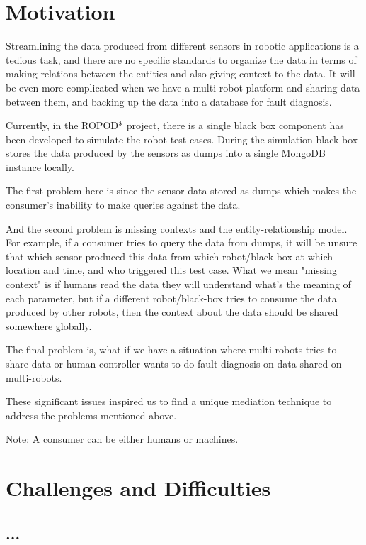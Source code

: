     \section{Motivation}
    
Streamlining the data produced from different sensors in robotic applications is a tedious task, and there are no specific standards to organize the data in terms of making relations between the entities and also giving context to the data. It will be even more complicated when we have a multi-robot platform and sharing data between them, and backing up the data into a database for fault diagnosis.

Currently, in the ROPOD* project, there is a single black box component has been developed to simulate the robot test cases. During the simulation black box stores the data produced by the sensors as dumps into a single MongoDB instance locally.  

The first problem here is since the sensor data stored as dumps which makes the consumer's inability to make queries against the data. 

And the second problem is missing contexts and the entity-relationship model. For example, if a consumer tries to query the data from dumps, it will be unsure that which sensor produced this data from which robot/black-box at which location and time, and who triggered this test case. What we mean "missing context" is if humans read the data they will understand what's the meaning of each parameter, but if a different robot/black-box tries to consume the data produced by other robots, then the context about the data should be shared somewhere globally.

The final problem is, what if we have a situation where multi-robots tries to share data or human controller wants to do fault-diagnosis on data shared on multi-robots. 

These significant issues inspired us to find a unique mediation technique to address the problems mentioned above. 

Note: 
A consumer can be either humans or machines.   


    \section{Challenges and Difficulties}
    \subsection{...}

